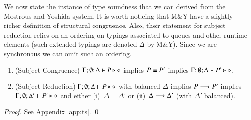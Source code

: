 We now state the instance of type soundness that we can derived from the Mostrous and Yoshida system.
It is worth noticing that M\&Y have a slightly richer definition of structural congruence.
Also, their statement for subject reduction relies on an ordering on typings associated to queues and other 
runtime elements (such extended typings are denoted $\Delta$ by M\&Y).
Since we are synchronous we can omit such an ordering.

\begin{theorem}\label{t:sr}\rm
%
	\begin{enumerate}[1.]
		\item	(Subject Congruence)
			$\Gamma; \emptyset; \Delta \vdash P \triangleright \diamond$
			implies
			$P \equiv P'$ implies $\Gamma; \emptyset; \Delta \vdash P' \triangleright \diamond$.

		\item	(Subject Reduction)
			$\Gamma; \emptyset; \Delta \vdash P \triangleright \diamond$
			with
			balanced $\Delta$
			implies
			$P \longrightarrow P'$ implies $\Gamma; \emptyset; \Delta'  \vdash P' \triangleright \diamond$
			and either (i)~$\Delta = \Delta'$ or (ii)~$\Delta \longrightarrow \Delta'$
			(with $\Delta'$ balanced).
	\end{enumerate}
\end{theorem}

\begin{proof}
	See Appendix \ref{app:ts}.
	\qed
\end{proof}
